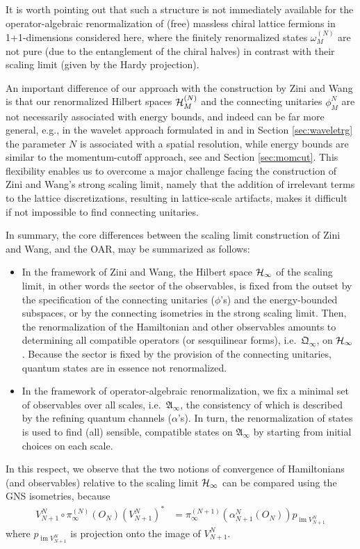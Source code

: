 \documentclass[a4paper, 11pt]{article}
\newcommand{\fA}{\mathfrak{A}}\newcommand{\cA}{\mathcal{A}}\newcommand{\dA}{\mathds{A}}\newcommand{\sA}{\mathscr{A}}
\newcommand{\fQ}{\mathfrak{Q}}
\DeclareMathOperator{\1}{\mathds{1}}
\DeclareMathOperator{\im}{im}
\begin{document}
It is worth pointing out that such a structure is not immediately available for the operator-algebraic renormalization of (free) massless chiral lattice fermions in 1+1-dimensions considered here, where the finitely renormalized states $\omega^{(N)}_{M}$ are not pure (due to the entanglement of the chiral halves) in contrast with their scaling limit (given by the Hardy projection).

An important difference of our approach with the construction by Zini and Wang is that our renormalized Hilbert spaces $\mathcal{H}_{M}^{(N)}$ and the connecting unitaries $\phi^{N}_{M}$ are not necessarily associated with energy bounds, and indeed can be far more general, e.g., in the wavelet approach formulated in \cite{StottmeisterOperatorAlgebraicRenormalization} and in Section \ref{sec:waveletrg} the parameter $N$ is associated with a spatial resolution, while energy bounds are similar to the momentum-cutoff approach, see \cite{MorinelliScalingLimitsOf} and Section \ref{sec:momcut}. This flexibility enables us to overcome a major challenge facing the construction of Zini and Wang's strong scaling limit, namely that the addition of irrelevant terms to the lattice discretizations, resulting in lattice-scale artifacts, makes it difficult if not impossible to find connecting unitaries. 

In summary, the core differences between the scaling limit construction of Zini and Wang, and the OAR, may be summarized as follows: 
\begin{itemize}
	\item In the framework of Zini and Wang, the Hilbert space $\mathcal{H}_{\infty}$ of the scaling limit, in other words the sector of the observables, is fixed from the outset by the specification of the connecting unitaries ($\phi$'s) and the energy-bounded subspaces, or by the connecting isometries in the strong scaling limit. Then, the renormalization of the Hamiltonian and other observables amounts to determining all compatible operators (or sesquilinear forms), i.e.~$\fQ_{\infty}$, on $\mathcal{H}_{\infty}$. Because the sector is fixed by the provision of the connecting unitaries, quantum states are in essence not renormalized.
	\item In the framework of operator-algebraic renormalization, we fix a minimal set of observables over all scales, i.e.~$\fA_{\infty}$, the consistency of which is described by the refining quantum channels ($\alpha$'s). In turn, the renormalization of states is used to find (all) sensible, compatible states on $\fA_{\infty}$ by starting from initial choices on each scale.
\end{itemize}
In this respect, we observe that the two notions of convergence of Hamiltonians (and observables) relative to the scaling limit $\mathcal{H}_{\infty}$ can be compared using the GNS isometries, because
\begin{align*}
V^{N}_{N+1}\circ \pi_{\infty}^{(N)}(O_{N})(V^{N}_{N+1})^{*} & \!=\!\pi_{\infty}^{(N+1)}(\alpha^{N}_{N+1}(O_{N}))p_{\im V^{N}_{N+1}}
\end{align*}
where $p_{\im V^{N}_{N+1}}$ is projection onto the image of $V^{N}_{N+1}$.
\end{document}
